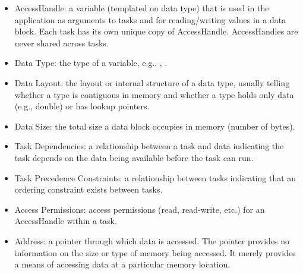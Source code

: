 \begin{itemize}
\item AccessHandle: a variable (templated on data type) that is used in the application as arguments to tasks and for reading/writing values in a data block.
Each task has its own unique copy of AccessHandle. AccessHandles are never shared across tasks.
\item Data Type: the type of a variable, e.g., , .
\item Data Layout: the layout or internal structure of a data type, usually telling whether a type is contiguous in memory and whether a type holds only data (e.g., double) or has lookup pointers.
\item Data Size: the total size a data block occupies in memory (number of bytes).
\item Task Dependencies: a relationship between a task and data indicating the task depends on the data being available before the task can run.
\item Task Precedence Constraints: a relationship between tasks indicating that an ordering constraint exists between tasks.
\item Access Permissions: access permissions (read, read-write, etc.) for an AccessHandle within a task.
\item Address: a pointer through which data is accessed.
The pointer provides no information on the size or type of memory being accessed.
It merely provides a means of accessing data at a particular memory location.
\end{itemize}

